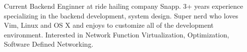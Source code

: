 

\begin{cvparagraph}

Current Backend Enginner at ride hailing company Snapp.
3+ years experience specializing in the backend development, system design.
Super nerd who loves Vim, Linux and OS X and enjoys to customize all of the development environment.
Interested in Network Function Virtualization, Optimization, Software Defined Networking.
\end{cvparagraph}
